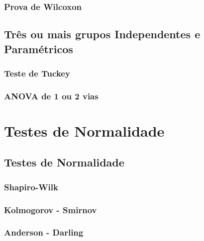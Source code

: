 \documentclass[
]{book}
\begin{document}
\hypertarget{prova-de-wilcoxon}{%
\section{Prova de Wilcoxon}\label{prova-de-wilcoxon}}

\hypertarget{truxeas-ou-mais-grupos-independentes-e-paramuxe9tricos}{%
\chapter{Três ou mais grupos Independentes e Paramétricos}\label{truxeas-ou-mais-grupos-independentes-e-paramuxe9tricos}}

\hypertarget{teste-de-tuckey}{%
\section{Teste de Tuckey}\label{teste-de-tuckey}}

\hypertarget{anova-de-1-ou-2-vias}{%
\section{ANOVA de 1 ou 2 vias}\label{anova-de-1-ou-2-vias}}

\hypertarget{part-testes-de-normalidade}{%
\part{Testes de Normalidade}\label{part-testes-de-normalidade}}

\hypertarget{testes-de-normalidade}{%
\chapter{Testes de Normalidade}\label{testes-de-normalidade}}

\hypertarget{shapiro-wilk}{%
\section{Shapiro-Wilk}\label{shapiro-wilk}}

\hypertarget{kolmogorov---smirnov}{%
\section{Kolmogorov - Smirnov}\label{kolmogorov---smirnov}}

\hypertarget{anderson---darling}{%
\section{Anderson - Darling}\label{anderson---darling}}
\end{document}
